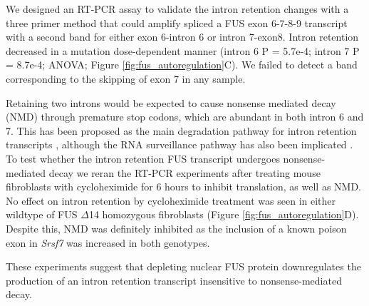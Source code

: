 We designed an RT-PCR assay to validate the intron retention changes with a three primer method that could amplify spliced a FUS exon 6-7-8-9 transcript with a second band for either exon 6-intron 6 or intron 7-exon8. 
Intron retention decreased in a mutation dose-dependent manner (intron 6 P = 5.7e-4; intron 7 P = 8.7e-4; ANOVA; Figure \ref{fig:fus_autoregulation}C).
We failed to detect a band corresponding to the skipping of exon 7 in any sample. 

Retaining two introns would be expected to cause nonsense mediated decay (NMD) through premature stop codons, which are abundant in both intron 6 and 7. 
This has been proposed as the main degradation pathway for intron retention transcripts \citep{Wong2013}, although the RNA surveillance pathway has also been implicated \citep{Yap2013}. 
To test whether the intron retention FUS transcript undergoes nonsense-mediated decay we reran the RT-PCR experiments after treating mouse fibroblasts with cycloheximide for 6 hours to inhibit translation, as well as NMD.  
No effect on intron retention by cycloheximide treatment was seen in either wildtype of FUS $\Delta$14 homozygous fibroblasts (Figure \ref{fig:fus_autoregulation}D).
Despite this, NMD was definitely inhibited as the inclusion of a known poison exon in \textit{Srsf7} \citep{Edwards2016} was increased in both genotypes. 

These experiments suggest that depleting nuclear FUS protein downregulates the production of an intron retention transcript insensitive to nonsense-mediated decay. 






